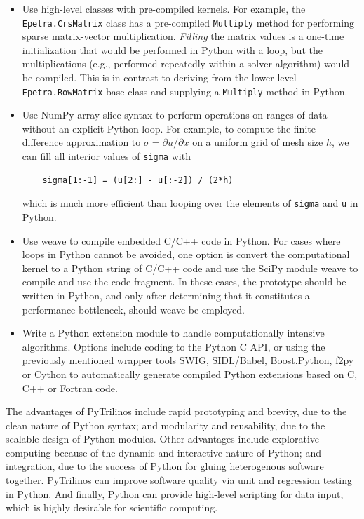 \documentclass[11pt]{article}
\begin{document}
\begin{itemize}

\item Use high-level classes with pre-compiled kernels.  For example, the {\tt Epetra.CrsMatrix} class has a pre-compiled {\tt Multiply} method for performing sparse matrix-vector multiplication.  {\em Filling} the matrix values is a one-time initialization that would be performed in Python with a loop, but the multiplications (e.g., performed repeatedly within a solver algorithm) would be compiled.  This is in contrast to deriving from the lower-level {\tt Epetra.RowMatrix} base class and supplying a {\tt Multiply} method in Python.

\item Use NumPy array slice syntax to perform operations on ranges of data without an explicit Python loop.  For example, to compute the finite difference approximation to $\sigma = \partial u/\partial x$ on a uniform grid of mesh size $h$, we can fill all interior values of {\tt sigma} with

\begin{verbatim}
    sigma[1:-1] = (u[2:] - u[:-2]) / (2*h)
\end{verbatim}

which is much more efficient than looping over the elements of {\tt sigma} and {\tt u} in Python.

\item Use weave to compile embedded C/C++ code in Python.  For cases where loops in Python cannot be avoided, one option is convert the computational kernel to a Python string of C/C++ code and use the SciPy module weave to compile and use the code fragment.  In these cases, the prototype should be written in Python, and only after determining  that it constitutes a performance bottleneck, should weave be employed.

\item Write a Python extension module to handle computationally intensive algorithms.  Options include coding to the Python C API, or using the previously mentioned wrapper tools SWIG, SIDL/Babel, Boost.Python, f2py or Cython to automatically generate compiled Python extensions based on C, C++ or Fortran code.
\end{itemize}

The advantages of PyTrilinos include rapid prototyping and brevity, due to the clean nature of Python syntax; and modularity and reusability, due to the scalable design of Python modules.  Other advantages include explorative computing because of the dynamic and interactive nature of Python; and integration, due to the success of Python for gluing heterogenous software together.  PyTrilinos can improve software quality via unit and regression testing in Python.  And finally, Python can provide high-level scripting for data input, which is highly desirable for scientific computing.
\end{document}
